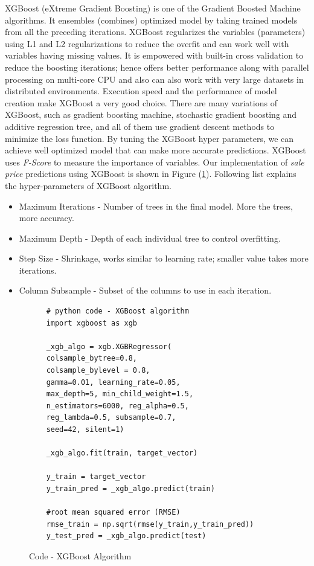 \documentclass[sigconf]{acmart}
\begin{document}
XGBoost (eXtreme Gradient Boosting) is one of the Gradient Boosted Machine algorithms. It ensembles (combines) optimized model by taking trained models from all the preceding iterations. XGBoost regularizes the variables (parameters) using L1 and L2 regularizations to reduce the overfit and can work well with variables having missing values. It is empowered with built-in cross validation to reduce the boosting iterations; hence offers better performance along with parallel processing on multi-core CPU and also can also work with very large datasets in distributed environments. Execution speed and the performance of model creation make XGBoost a very good choice. There are many variations of XGBoost, such as gradient boosting machine, stochastic gradient boosting and additive regression tree, and all of them use gradient descent methods to minimize the loss function. By tuning the XGBoost hyper parameters, we can achieve well optimized model that can make more accurate predictions. XGBoost uses {\em F-Score} to measure the importance of  variables. Our implementation of {\em sale price} predictions using XGBoost is shown in Figure (\ref{c:xgb}). Following list explains the hyper-parameters of XGBoost algorithm.

\begin{itemize}
	\item  Maximum Iterations - Number of trees in the final model. More the trees, more accuracy.
	\item  Maximum Depth - Depth of each individual tree to control overfitting.
	\item  Step Size - Shrinkage, works similar to learning rate; smaller value takes more iterations.
	\item  Column Subsample - Subset of the columns to use in each iteration.
\end{itemize}

\begin{figure}[htb]
	\begin{verbatim}
	# python code - XGBoost algorithm
	import xgboost as xgb
	
	_xgb_algo = xgb.XGBRegressor(
	colsample_bytree=0.8,
	colsample_bylevel = 0.8,
	gamma=0.01,	learning_rate=0.05,
	max_depth=5, min_child_weight=1.5,
	n_estimators=6000, reg_alpha=0.5,
	reg_lambda=0.5,	subsample=0.7,
	seed=42, silent=1)
	
	_xgb_algo.fit(train, target_vector)   
	
	y_train = target_vector
	y_train_pred = _xgb_algo.predict(train)
	
	#root mean squared error (RMSE)
	rmse_train = np.sqrt(rmse(y_train,y_train_pred))	
	y_test_pred = _xgb_algo.predict(test)	
	\end{verbatim}
	\caption{Code - XGBoost Algorithm} \label{c:xgb} 
\end{figure}
\end{document}
